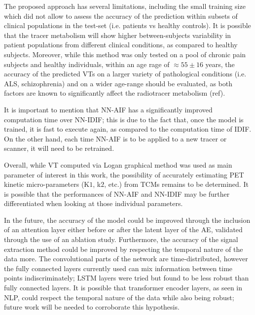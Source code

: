     The proposed approach has several limitations, including the small training size which did not allow to assess the accuracy of the prediction within subsets of clinical populations in the test-set (i.e. patients vs healthy controls). It is possible that the tracer metabolism will show higher between-subjects variability in patient populations from different clinical conditions, as compared to healthy subjects. Moreover, while this method was only tested on a pool of chronic pain subjects and healthy individuals, within an age rage of $\approx 55 \pm 16$ years, the accuracy of the predicted \glspl{VT} on a larger variety of pathological conditions (i.e. \gls{ALS}, schizophrenia) and on a wider age-range should be evaluated, as both factors are known to significantly affect the radiotracer metabolism (ref). 
    
    It is important to mention that \gls{NN}-\gls{AIF} has a significantly improved computation time over \gls{NN}-\gls{IDIF}; this is due to the fact that, once the model is trained, it is fast to execute again, as compared to the computation time of \gls{IDIF}. On the other hand, each time \gls{NN}-\gls{AIF} is to be applied to a new tracer or scanner, it will need to be retrained.

    Overall, while \gls{VT} computed via Logan graphical method was used as main parameter of interest in this work, the possibility of accurately estimating \gls{PET} kinetic micro-parameters (K$1$, k$2$, etc.) from \glspl{TCM} remains to be determined. It is possible that the performances of \gls{NN}-\gls{AIF} and \gls{NN}-\gls{IDIF} may be further differentiated when looking at those individual parameters.
    
    In the future, the accuracy of the model could be improved through the inclusion of an attention layer either before or after the latent layer of the \gls{AE}, validated through the use of an ablation study. Furthermore, the accuracy of the signal extraction method could be improved by respecting the temporal nature of the data more. The convolutional parts of the network are time-distributed, however the fully connected layers currently used can mix information between time points indiscriminately; \gls{LSTM} layers were tried but found to be less robust than fully connected layers. It is possible that transformer encoder layers, as seen in \gls{NLP}, could respect the temporal nature of the data while also being robust; future work will be needed to corroborate this hypothesis.
